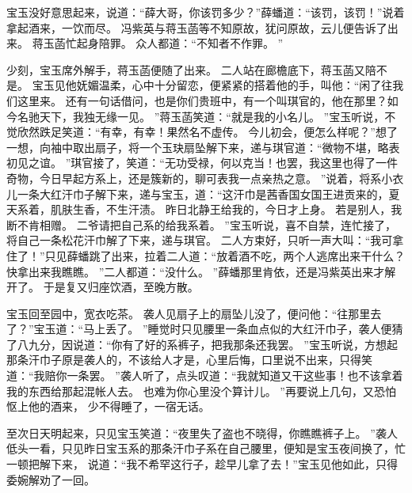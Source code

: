 宝玉没好意思起来，说道：“薛大哥，你该罚多少？”薛蟠道：“该罚，该罚！”说着拿起酒来，一饮而尽。
冯紫英与蒋玉菡等不知原故，犹问原故，云儿便告诉了出来。
蒋玉菡忙起身陪罪。
众人都道：“不知者不作罪。
”\par
少刻，宝玉席外解手，蒋玉菡便随了出来。
二人站在廊檐底下，蒋玉菡又陪不是。
宝玉见他妩媚温柔，心中十分留恋，便紧紧的搭着他的手，叫他：“闲了往我们这里来。
还有一句话借问，也是你们贵班中，有一个叫琪官的，他在那里？如今名驰天下，我独无缘一见。
”蒋玉菡笑道：“就是我的小名儿。
”宝玉听说，不觉欣然跌足笑道：“有幸，有幸！果然名不虚传。
今儿初会，便怎么样呢？”想了一想，向袖中取出扇子，将一个玉玦扇坠解下来，递与琪官道：“微物不堪，略表初见之谊。
”琪官接了，笑道：“无功受禄，何以克当！也罢，我这里也得了一件奇物，今日早起方系上，还是簇新的，聊可表我一点亲热之意。
”说着，将系小衣儿一条大红汗巾子解下来，递与宝玉，道：“这汗巾是茜香国女国王进贡来的，夏天系着，肌肤生香，不生汗渍。
昨日北静王给我的，今日才上身。
若是别人，我断不肯相赠。
二爷请把自己系的给我系着。
”宝玉听说，喜不自禁，连忙接了，将自己一条松花汗巾解了下来，递与琪官。
二人方束好，只听一声大叫：“我可拿住了！”只见薛蟠跳了出来，拉着二人道：“放着酒不吃，两个人逃席出来干什么？快拿出来我瞧瞧。
”二人都道：“没什么。
”薛蟠那里肯依，还是冯紫英出来才解开了。
于是复又归座饮酒，至晚方散。
\par
宝玉回至园中，宽衣吃茶。
袭人见扇子上的扇坠儿没了，便问他：“往那里去了？”宝玉道：“马上丢了。
”睡觉时只见腰里一条血点似的大红汗巾子，袭人便猜了八九分，因说道：“你有了好的系裤子，把我那条还我罢。
”宝玉听说，方想起那条汗巾子原是袭人的，不该给人才是，心里后悔，口里说不出来，只得笑道：“我赔你一条罢。
”袭人听了，点头叹道：“我就知道又干这些事！也不该拿着我的东西给那起混帐人去。
也难为你心里没个算计儿。
”再要说上几句，又恐怕怄上他的酒来，
少不得睡了，一宿无话。
\par
至次日天明起来，只见宝玉笑道：“夜里失了盗也不晓得，你瞧瞧裤子上。
”袭人低头一看，只见昨日宝玉系的那条汗巾子系在自己腰里，便知是宝玉夜间换了，忙一顿把解下来，
说道：“我不希罕这行子，趁早儿拿了去！”宝玉见他如此，只得委婉解劝了一回。
